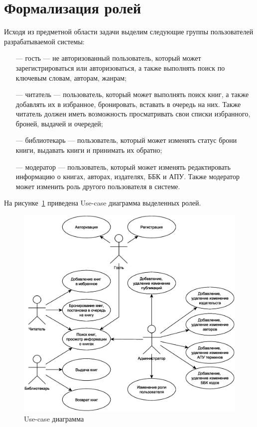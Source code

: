 \section{Формализация ролей}
Исходя из предметной области задачи выделим следующие группы пользователей разрабатываемой системы:
\begin{itemize}
    \item[---] гость --- не авторизованный пользователь, который может зарегистрироваться или авторизоваться, а также выполнять поиск по ключевым словам, авторам, жанрам;
    \item[---] читатель --- пользователь, который может выполнять поиск книг, а также добавлять их в избранное, бронировать, вставать в очередь на них. Также читатель должен иметь возможность просматривать свои списки избранного, броней, выдачей и очередей;
    \item[---] библиотекарь --- пользователь, который может изменять статус брони книги, выдавать книги и принимать их обратно;
    \item[---] модератор --- пользователь, который может изменять редактировать информацию о книгах, авторах, издателях, ББК и АПУ. Также модератор может изменить роль другого пользователя в системе.
\end{itemize}

На рисунке~\ref{fig:use-case} приведена Use-case диаграмма выделенных ролей.
\begin{figure}[H]
	\centering
	\includegraphics[scale=0.6]{img/use-case.eps}
	\caption{Use-case диаграмма}
	\label{fig:use-case}
\end{figure}

